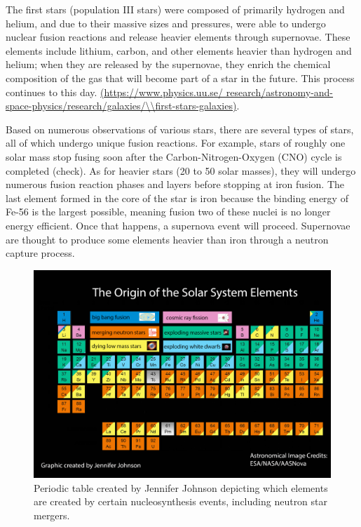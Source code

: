 \documentclass[11pt,a4paper]{article}
\begin{document}
The first stars (population III stars) were composed of primarily hydrogen and helium, and due to their massive sizes and pressures, were able to undergo nuclear fusion reactions and release heavier elements through supernovae. These elements include lithium, carbon, and other elements heavier than hydrogen and helium; when they are released by the supernovae, they enrich the chemical composition of the gas that will become part of a star in the future. This process continues to this day. \url{(https://www.physics.uu.se/ research/astronomy-and-space-physics/research/galaxies/\\first-stars-galaxies)}. 

Based on numerous observations of various stars, there are several types of stars, all of which undergo unique fusion reactions. For example, stars of roughly one solar mass stop fusing soon after the Carbon-Nitrogen-Oxygen (CNO) cycle is completed (check). As for heavier stars (20 to 50 solar masses), they will undergo numerous fusion reaction phases and layers before stopping at iron fusion. The last element formed in the core of the star is iron because the binding energy of Fe-56 is the largest possible, meaning fusion two of these nuclei is no longer energy efficient. Once that happens, a supernova event will proceed. Supernovae are thought to produce some elements heavier than iron through a neutron capture process. 

\begin{figure}[h!]
  \includegraphics[width=1\textwidth]{periodic_table.png}
  \caption{Periodic table created by Jennifer Johnson depicting which elements are created by certain nucleosynthesis events, including neutron star mergers.}
\end{figure}
\end{document}
